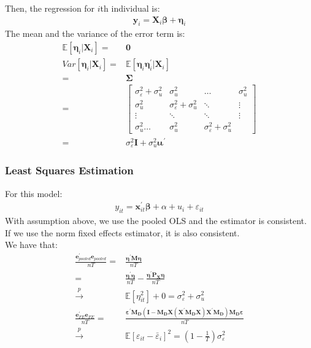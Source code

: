 \documentclass{article}
\begin{document}
Then, the regression for $i$th individual is:
	\begin{align*}
		\boldsymbol{y}_i = \boldsymbol{X}_i \boldsymbol{\beta} + \boldsymbol{\eta}_i
	\end{align*}
The mean and the variance of the error term is:
	\begin{align*}
		\mathbb{E} [\boldsymbol{\eta}_i | \boldsymbol{X}_i] = &\boldsymbol{0}\\
		Var[\boldsymbol{\eta}_i | \boldsymbol{X}_i] = &\mathbb{E} [\boldsymbol{\eta}_i \boldsymbol{\eta}^\prime_i | \boldsymbol{X}_i]\\
		= &\boldsymbol{\Sigma}\\ = &
		\begin{bmatrix}
			\sigma^2_\varepsilon + \sigma^2_u & \sigma^2_u & \ldots & \sigma^2_u\\
			\sigma^2_u & \sigma^2_\varepsilon + \sigma^2_u & \ddots & \vdots\\
			\vdots & \ddots & \ddots & \vdots\\
			\sigma^2_u \ldots & \sigma^2_u & \sigma^2_\varepsilon + \sigma^2_u
		\end{bmatrix}\\ = &
		\sigma^2_\varepsilon \boldsymbol{I} + \sigma^2_u \boldsymbol{\iota} \boldsymbol{\iota}^\prime
	\end{align*}

\subsubsection{Least Squares Estimation}
For this model:
	\begin{align*}
		y_{it} = \boldsymbol{x}^\prime_{it} \boldsymbol{\beta} + \alpha + u_i + \varepsilon_{it}
	\end{align*}
With assumption above, we use the pooled OLS and the estimator is consistent.\\
If we use the norm fixed effects estimator, it is also consistent.\\
We have that:
	\begin{align*}
		\frac{\boldsymbol{e}^\prime_{pooled} \boldsymbol{e}_{pooled}}{nT} = &\frac{\boldsymbol{\eta}^\prime \boldsymbol{M} \boldsymbol{\eta}}{nT}\\ = &
		\frac{\boldsymbol{\eta}^\prime \boldsymbol{\eta}}{nT} - \frac{\boldsymbol{\eta}^\prime \boldsymbol{P_X} \boldsymbol{\eta}}{nT}\\ \xrightarrow{p} &
		\mathbb{E} [\eta^2_{it}] + 0 = \sigma^2_{\varepsilon} + \sigma^2_u\\
		\frac{\boldsymbol{e}^\prime_{FE} \boldsymbol{e}_{FE}}{nT} = & \frac{\boldsymbol{\boldsymbol{\varepsilon}^\prime \boldsymbol{M_D} (\boldsymbol{I} - \boldsymbol{M_D} \boldsymbol{X} (\boldsymbol{X}^\prime \boldsymbol{M_D} \boldsymbol{X}) \boldsymbol{X}^\prime \boldsymbol{M_D}) \boldsymbol{M_D} \boldsymbol{\varepsilon}}}{nT}\\ \xrightarrow{p} &
		\mathbb{E} [\varepsilon_{it} - \bar{\varepsilon}_i]^2 = (1 - \frac{1}{T})\sigma^2_\varepsilon
	\end{align*}
\end{document}

